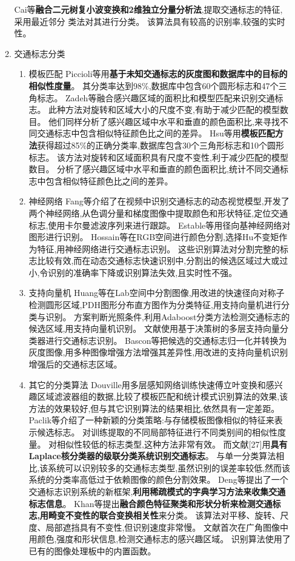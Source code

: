 \documentclass{amsart}
\begin{document}
\begin{enumerate}
\begin{enumerate}
    Cai等\textbf{融合二元树复小波变换和2维独立分量分析法},提取交通标志的特征,采用最近邻分
    类法对其进行分类。
    该算法具有较高的识别率,较强的实时性。
  \item 交通标志分类
    \begin{enumerate}
    \item 模板匹配
      Piccioli等用\textbf{基于未知交通标志的灰度图和数据库中的目标的相似性度量}。
      其分类率达到98\%,数据库中包含60个圆形标志和47个三角标志。
      Zadeh等融合感兴趣区域的面积比和模型匹配来识别交通标志。
      此种方法对旋转和区域大小的尺度不变,有助于减少匹配的模型数目。
      他们同样分析了感兴趣区域中水平和垂直的颜色面积比,来寻找不同交通标志中包含相似特征颜色比之间的差异。
      Hsu等用\textbf{模板匹配方法}获得超过85\%的正确分类率,数据库包含30个三角形标志和10个圆形标志。
      该方法对旋转和区域面积具有尺度不变性,利于减少匹配的模型数目。
      分析了感兴趣区域中水平和垂直的颜色面积比,统计不同交通标志中包含相似特征颜色比之间的差异。
    \item 神经网络
      Fang等介绍了在视频中识别交通标志的动态视觉模型,开发了两个神经网络,从色调分量和梯度图像中提取颜色和形状特征,定位交通标志,使用卡尔曼滤波序列来进行跟踪。
      Estable等用径向基神经网络对图形进行识别。
      Hossain等在RGB空间进行颜色分割,选择Hu不变矩作为特征,用神经网络进行交通标志识别。
      这些识别算法对分割完整的标志比较有效,而在动态交通标志快速识别中,分割出的候选区域过大或过小,令识别的准确率下降或识别算法失效,且实时性不强。
    \item 支持向量机
      Huang等在Lab空间中分割图像,用改进的快速径向对称子检测圆形区域,PDH图形分布直方图作为分类特征,用支持向量机进行分类与识别。
      方案判断光照条件,利用Adaboost分类方法检测交通标志的候选区域,用支持向量机识别。
      文献使用基于决策树的多层支持向量分类器进行交通标志识别。
      Bascon等把候选的交通标志归一化并转换为灰度图像,用多种图像增强方法增强其差异性,用改进的支持向量机识别增强后的交通标志区域。
    \item 其它的分类算法
      Douville用多层感知网络训练快速傅立叶变换和感兴趣区域滤波器组的数据,比较了模板匹配和统计模式识别算法的效果,该方法的效果较好,但与其它识别算法的结果相比,依然具有一定差距。
      Paclik等介绍了一种新颖的分类策略:与存储模板图像相似的特征来表示候选标志。
      对训练提取的不同局部特征进行不同类别间的相似性度量。
      对相似性较低的标志类型,这种方法非常有效。
      而文献[27]用\textbf{具有Laplace核分类器的级联分类系统识别交通标志}。
      与单一分类算法相比,该系统可以识别较多的交通标志类型,虽然识别的误差率较低,然而该系统的分类率高低过于依赖图像的颜色分割效果。
      Deng等提出了一个交通标志识别系统的新框架,\textbf{利用稀疏模式的字典学习方法来收集交通标志信息}。
      Khan等提出\textbf{融合颜色特征聚类和形状分析来检测交通标志,用畸变不变性的联合变换相关性}来分类。
      该算法对平移、旋转、尺度、局部遮挡具有不变性,但识别速度非常慢。
      文献首次在广角图像中用颜色,强度和形状信息,检测交通标志的感兴趣区域。
      识别算法使用了已有的图像处理板中的内置函数。
    \end{enumerate}
  \end{enumerate}
  \end{enumerate}




\end{document}
